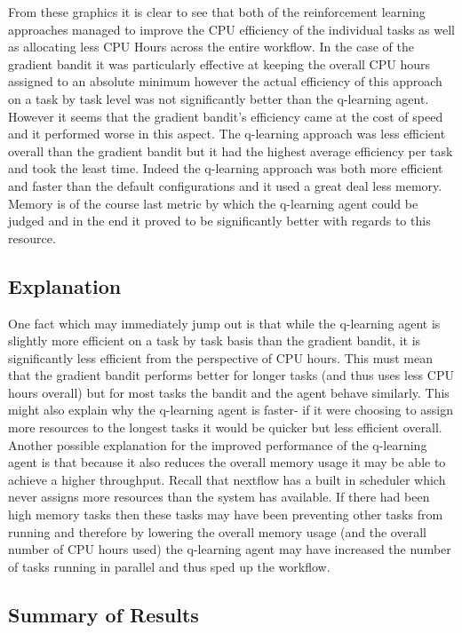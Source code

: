 From these graphics it is clear to see that both of the reinforcement learning approaches managed to improve the CPU efficiency of the individual tasks as well as allocating less CPU Hours across the entire workflow. In the case of the gradient bandit it was particularly effective at keeping the overall CPU hours assigned to an absolute minimum however the actual efficiency of this approach on a task by task level was not significantly better than the q-learning agent. However it seems that the gradient bandit's efficiency came at the cost of speed and it performed worse in this aspect. The q-learning approach was less efficient overall than the gradient bandit but it had the highest average efficiency per task and took the least time. Indeed the q-learning approach was both more efficient and faster than the default configurations and it used a great deal less memory. Memory is of the course last metric by which the q-learning agent could be judged and in the end it proved to be significantly better with regards to this resource.

\subsection{Explanation}
\label{sub:explanation}

One fact which may immediately jump out is that while the q-learning agent is slightly more efficient on a task by task basis than the gradient bandit, it is significantly less efficient from the perspective of CPU hours. This must mean that the gradient bandit performs better for longer tasks (and thus uses less CPU hours overall) but for most tasks the bandit and the agent behave similarly. This might also explain why the q-learning agent is faster- if it were choosing to assign more resources to the longest tasks it would be quicker but less efficient overall. Another possible explanation for the improved performance of the q-learning agent is that because it also reduces the overall memory usage it may be able to achieve a higher throughput. Recall that nextflow has a built in scheduler which never assigns more resources than the system has available. If there had been high memory tasks then these tasks may have been preventing other tasks from running and therefore by lowering the overall memory usage (and the overall number of CPU hours used) the q-learning agent may have increased the number of tasks running in parallel and thus sped up the workflow. 

\subsection{Summary of Results}
\label{sub:summary}

